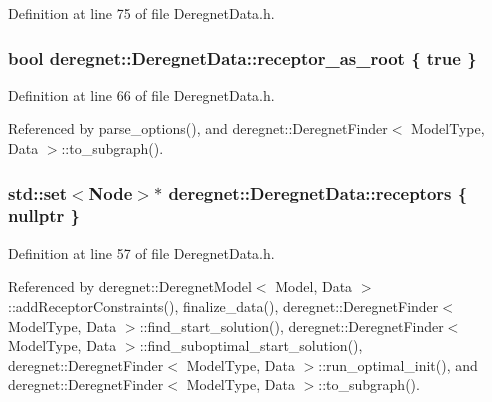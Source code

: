 Definition at line 75 of file Deregnet\+Data.\+h.

\subsubsection[{\texorpdfstring{receptor\+\_\+as\+\_\+root}{receptor_as_root}}]{\setlength{\rightskip}{0pt plus 5cm}bool deregnet\+::\+Deregnet\+Data\+::receptor\+\_\+as\+\_\+root \{ true \}}\hypertarget{classderegnet_1_1DeregnetData_ae7936fe59661a68464134b9251303727}{}\label{classderegnet_1_1DeregnetData_ae7936fe59661a68464134b9251303727}


Definition at line 66 of file Deregnet\+Data.\+h.



Referenced by parse\+\_\+options(), and deregnet\+::\+Deregnet\+Finder$<$ Model\+Type, Data $>$\+::to\+\_\+subgraph().

\subsubsection[{\texorpdfstring{receptors}{receptors}}]{\setlength{\rightskip}{0pt plus 5cm}std\+::set$<${\bf Node}$>$$\ast$ deregnet\+::\+Deregnet\+Data\+::receptors \{ nullptr \}}\hypertarget{classderegnet_1_1DeregnetData_a470cc9f84741c59897ab1e7a3daa1205}{}\label{classderegnet_1_1DeregnetData_a470cc9f84741c59897ab1e7a3daa1205}


Definition at line 57 of file Deregnet\+Data.\+h.



Referenced by deregnet\+::\+Deregnet\+Model$<$ Model, Data $>$\+::add\+Receptor\+Constraints(), finalize\+\_\+data(), deregnet\+::\+Deregnet\+Finder$<$ Model\+Type, Data $>$\+::find\+\_\+start\+\_\+solution(), deregnet\+::\+Deregnet\+Finder$<$ Model\+Type, Data $>$\+::find\+\_\+suboptimal\+\_\+start\+\_\+solution(), deregnet\+::\+Deregnet\+Finder$<$ Model\+Type, Data $>$\+::run\+\_\+optimal\+\_\+init(), and deregnet\+::\+Deregnet\+Finder$<$ Model\+Type, Data $>$\+::to\+\_\+subgraph().

